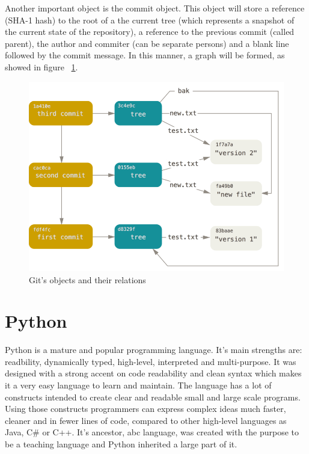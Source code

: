         Another important object is the commit object. This object will store a reference (SHA-1 hash) to the root of a the current tree (which represents a snapshot of the current state of the repository), a reference to the previous commit (called parent), the author and commiter (can be separate persons) and a blank line followed by the commit message. In this manner, a graph will be formed, as showed in figure ~\ref{fig:gitobjectsrelations}.

         \begin{figure}[h]
           \begin{center}
               \includegraphics[width=\textwidth]{theoretical/data-model-3.png}
            \end{center}
            \caption{\label{fig:gitobjectsrelations} Git's objects and their relations \cite{GDM}}
        \end{figure}

\section{Python}
    Python is a mature and popular programming language. It's main strengths are: readbility, dynamically typed, high-level, interpreted and multi-purpose. It was designed with a strong accent on code readability and clean syntax which makes it a very easy language to learn and maintain. The language has a lot of constructs intended to create clear and readable small and large scale programs. Using those constructs programmers can express complex ideas much faster, cleaner and in fewer lines of code, compared to other high-level languages as Java, C\# or C++. It's ancestor, abc language, was created with the purpose to be a teaching language and Python inherited a large part of it.

